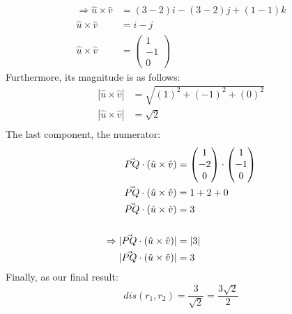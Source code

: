 \documentclass[hidelinks, a4paper, 12pt]{article}
\newcommand{\thus}{\Rightarrow}
\newcommand{\n}{\\[\baselineskip]}
\begin{document}
                \[\begin{split}
                    \thus\hat{u}\times\hat{v} &= (3-2)i - (3-2)j + (1-1)k\\
                    \hat{u}\times\hat{v} &= i - j\\
                    \hat{u}\times\hat{v} &= \begin{pmatrix} 1 \\ -1 \\ 0 \end{pmatrix}
                \end{split}\]
                Furthermore, its magnitude is as follows:
                \[\begin{split}
                    |\hat{u}\times\hat{v}| &= \sqrt{(1)^2 + (-1)^2 + (0)^2}\\
                    |\hat{u}\times\hat{v}| &= \sqrt{2}\\
                \end{split}\]
                The last component, the numerator:
                \[\begin{split}
                    \vec{PQ}\cdot(\hat{u}\times\hat{v}) &= \begin{pmatrix} 1 \\ -2 \\ 0 \end{pmatrix} \cdot \begin{pmatrix} 1 \\ -1 \\ 0 \end{pmatrix}\\
                    \vec{PQ}\cdot(\hat{u}\times\hat{v}) &= 1 + 2 + 0\\
                    \vec{PQ}\cdot(\hat{u}\times\hat{v}) &= 3\n
                    \thus |\vec{PQ}\cdot(\hat{u}\times\hat{v})| &= |3|\\
                    |\vec{PQ}\cdot(\hat{u}\times\hat{v})| &= 3
                \end{split}\]
                Finally, as our final result:
                \[dis(r_1, r_2) = \frac{3}{\sqrt{2}} = \frac{3\sqrt{2}}{2}\]
        
\end{document}
